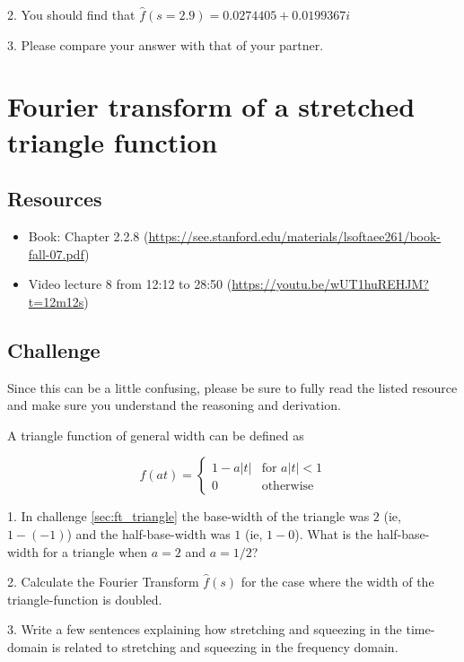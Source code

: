 2. You should find that $\hat{f}(s=2.9) = 0.0274405 + 0.0199367i$

3. Please compare your answer with that of your partner.




\newpage
\section{Fourier transform of a stretched triangle function}

\subsection*{Resources}
\begin{itemize}
    \item Book: Chapter 2.2.8 (\url{https://see.stanford.edu/materials/lsoftaee261/book-fall-07.pdf})
    \item Video lecture 8 from 12:12 to 28:50 (\url{https://youtu.be/wUT1huREHJM?t=12m12s})
\end{itemize}

\subsection*{Challenge}
Since this can be a little confusing, please be sure to fully read the listed resource and make sure you understand the reasoning and derivation.

A triangle function of general width can be defined as

\begin{equation}
    f(at)=
    \begin{cases}
        1 - a|t| & \text{for } a|t| < 1\\
        0 & \text{otherwise}
    \end{cases}
\end{equation}

1. In challenge \ref{sec:ft_triangle} the base-width of the triangle was $2$ (ie, $1-(-1)$) and the half-base-width was $1$ (ie, $1-0$). What is the half-base-width for a triangle when $a=2$ and $a=1/2$?

2. Calculate the Fourier Transform $\hat{f}(s)$ for the case where the width of the triangle-function is doubled.

3. Write a few sentences explaining how stretching and squeezing in the time-domain is related to stretching and squeezing in the frequency domain.

